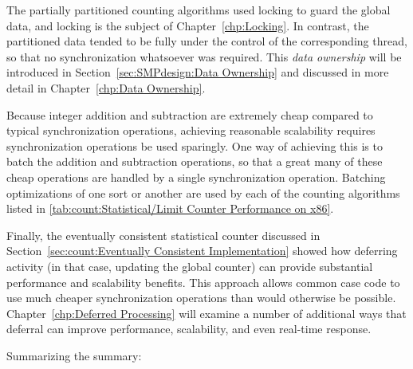 The partially partitioned counting algorithms used locking to
guard the global data, and locking is the subject of
Chapter~\ref{chp:Locking}.
In contrast, the partitioned data tended to be fully under the control of
the corresponding thread, so that no synchronization whatsoever was required.
This \emph{data ownership} will be introduced in
Section~\ref{sec:SMPdesign:Data Ownership}
and discussed in more detail in
Chapter~\ref{chp:Data Ownership}.

Because integer addition and subtraction are extremely cheap
compared to typical synchronization operations, achieving reasonable
scalability requires synchronization operations be used sparingly.
One way of achieving this is to batch the addition and subtraction
operations, so that a great many of these cheap operations are handled
by a single synchronization operation.
Batching optimizations of one sort or another are used by each of
the counting algorithms listed in
\cref{tab:count:Statistical/Limit Counter Performance on x86}.

Finally, the eventually consistent statistical counter discussed in
Section~\ref{sec:count:Eventually Consistent Implementation}
showed how deferring activity (in that case, updating the global
counter) can provide substantial performance and scalability benefits.
This approach allows common case code to use much cheaper synchronization
operations than would otherwise be possible.
Chapter~\ref{chp:Deferred Processing} will examine a number of additional
ways that deferral can improve performance, scalability, and even
real-time response.

Summarizing the summary:

